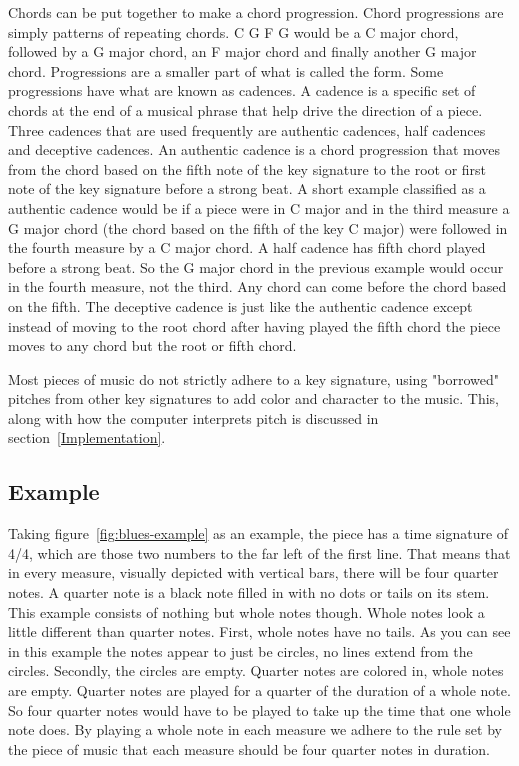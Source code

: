 \documentclass[12pt]{ucthesis}
\begin{document}
Chords can be put together to make a chord progression. Chord progressions are simply patterns of repeating chords. C G F G would be a C major chord, followed by a G major chord, an F major chord and finally another G major chord. Progressions are a smaller part of what is called the form. Some progressions have what are known as cadences. A cadence is a specific set of chords at the end of a musical phrase that help drive the direction of a piece. Three cadences that are used frequently are authentic cadences, half cadences and deceptive cadences. An authentic cadence is a chord progression that moves from the chord based on the fifth note of the key signature to the root or first note of the key signature before a strong beat. A short example classified as a authentic cadence would be if a piece were in C major and in the third measure a G major chord (the chord based on the fifth of the key C major) were followed in the fourth measure by a C major chord. A half cadence has fifth chord played before a strong beat. So the G major chord in the previous example would occur in the fourth measure, not the third. Any chord can come before the chord based on the fifth. The deceptive cadence is just like the authentic cadence except instead of moving to the root chord after having played the fifth chord the piece moves to any chord but the root or fifth chord. 

Most pieces of music do not strictly adhere to a key signature, using "borrowed" pitches from other key signatures to add color and character to the music. This, along with how the computer interprets pitch is discussed in section~\ref{Implementation}.

\subsection{Example}

Taking figure~\ref{fig:blues-example} as an example, the piece has a time signature of 4/4, which are those two numbers to the far left of the first line. That means that in every measure, visually depicted with vertical bars, there will be four quarter notes. A quarter note is a black note filled in with no dots or tails on its stem. This example consists of nothing but whole notes though. Whole notes look a little different than quarter notes. First, whole notes have no tails. As you can see in this example the notes appear to just be circles, no lines extend from the circles. Secondly, the circles are empty. Quarter notes are colored in, whole notes are empty. Quarter notes are played for a quarter of the duration of a whole note. So four quarter notes would have to be played to take up the time that one whole note does. By playing a whole note in each measure we adhere to the rule set by the piece of music that each measure should be four quarter notes in duration.
\end{document}
